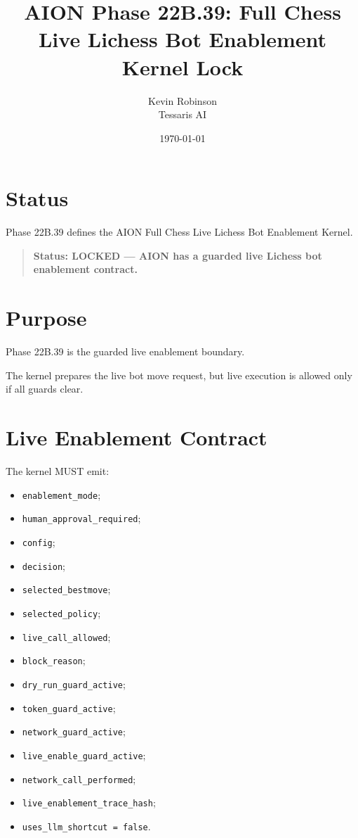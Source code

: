 \documentclass[11pt,a4paper]{article}
\title{\textbf{AION Phase 22B.39: Full Chess Live Lichess Bot Enablement Kernel Lock}}
\author{Kevin Robinson\\Tessaris AI}
\date{\today}
\begin{document}
\maketitle

\section{Status}

Phase 22B.39 defines the AION Full Chess Live Lichess Bot Enablement Kernel.

\begin{quote}
\textbf{Status: LOCKED --- AION has a guarded live Lichess bot enablement contract.}
\end{quote}

\section{Purpose}

Phase 22B.39 is the guarded live enablement boundary.

The kernel prepares the live bot move request, but live execution is allowed only if all guards clear.

\section{Live Enablement Contract}

The kernel MUST emit:

\begin{itemize}
  \item \texttt{enablement\_mode};
  \item \texttt{human\_approval\_required};
  \item \texttt{config};
  \item \texttt{decision};
  \item \texttt{selected\_bestmove};
  \item \texttt{selected\_policy};
  \item \texttt{live\_call\_allowed};
  \item \texttt{block\_reason};
  \item \texttt{dry\_run\_guard\_active};
  \item \texttt{token\_guard\_active};
  \item \texttt{network\_guard\_active};
  \item \texttt{live\_enable\_guard\_active};
  \item \texttt{network\_call\_performed};
  \item \texttt{live\_enablement\_trace\_hash};
  \item \texttt{uses\_llm\_shortcut = false}.
\end{itemize}
\end{document}
